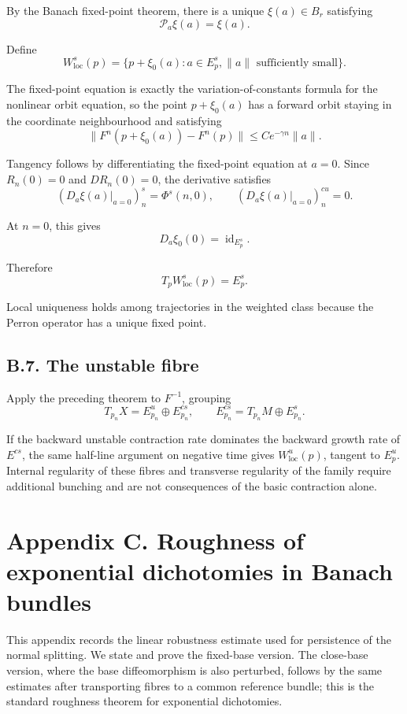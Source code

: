 \documentclass[12pt,a4paper]{article}
\theoremstyle{plain}
\numberwithin{equation}{section}
\numberwithin{theorem}{section}
\begin{document}
By the Banach fixed-point theorem, there is a unique $\xi(a)\in B_r$ satisfying
\[
\mathcal P_a\xi(a)=\xi(a).
\]

Define
\[
W^s_{\mathrm{loc}}(p)=
\{p+\xi_0(a):a\in E^s_p,
\|a\|\text{ sufficiently small}\}.
\]

The fixed-point equation is exactly the variation-of-constants formula for the nonlinear orbit equation, so the point $p+\xi_0(a)$ has a forward orbit staying in the coordinate neighbourhood and satisfying
\[
\|F^n(p+\xi_0(a))-F^n(p)\|
\le
C e^{-\gamma n}\|a\|.
\]

Tangency follows by differentiating the fixed-point equation at $a=0$. Since $R_n(0)=0$ and $DR_n(0)=0$, the derivative satisfies
\[
(D_a\xi(a)|_{a=0})_n^s=
\Phi^s(n,0),
\qquad
(D_a\xi(a)|_{a=0})_n^{cu}=0.
\]

At $n=0$, this gives
\[
D_a\xi_0(0)=\operatorname{id}_{E^s_p}.
\]

Therefore
\[
T_pW^s_{\mathrm{loc}}(p)=E^s_p.
\]

Local uniqueness holds among trajectories in the weighted class because the Perron operator has a unique fixed point.

\subsection{B.7. The unstable fibre}

Apply the preceding theorem to $F^{-1}$, grouping
\[
T_{p_n}X=E^u_{p_n}\oplus E^{cs}_{p_n},
\qquad
E^{cs}_{p_n}=T_{p_n}M\oplus E^s_{p_n}.
\]

If the backward unstable contraction rate dominates the backward growth rate of $E^{cs}$, the same half-line argument on negative time gives $W^u_{\mathrm{loc}}(p)$, tangent to $E^u_p$. Internal regularity of these fibres and transverse regularity of the family require additional bunching and are not consequences of the basic contraction alone.

\clearpage

\section{Appendix C. Roughness of exponential dichotomies in Banach bundles}

This appendix records the linear robustness estimate used for persistence of the normal splitting. We state and prove the fixed-base version. The close-base version, where the base diffeomorphism is also perturbed, follows by the same estimates after transporting fibres to a common reference bundle; this is the standard roughness theorem for exponential dichotomies.
\end{document}
